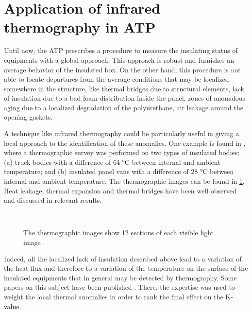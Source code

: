 \section{Application of infrared thermography in ATP}
Until now, the ATP prescribes a procedure to measure the insulating status of equipments with a global approach. This approach is robust and furnishes an average behavior of the insulated box. On the other hand, this procedure is not able to locate departures from the average conditions that may be localized somewhere in the structure, like thermal bridges due to structural elements, lack of insulation due to a bad foam distribution inside the panel, zones of anomalous aging due to a localized degradation of the polyurethane, air leakage around the opening gaskets. 

A technique like infrared thermography could be particularly useful in giving a local approach to the identification of these anomalies. One example is found in \citep{Estrada-Flores1996use}, where a thermographic survey was performed on two types of insulated bodies: (a) truck bodies with a difference of 64 °C between internal and ambient temperature; and (b) insulated panel vans with a difference of 28 °C between internal and ambient temperature. The thermographic images can be found in \ref{Estrada-Flores1996use}. Heat leakage, thermal expansion and thermal bridges have been well observed and discussed in relevant results. 

\begin{figure}[htbp]
	\centering
	\\
	\caption{The thermographic images show 12 sections of each visible light image \citep{Estrada-Flores1996use}.}
	\label{Estrada-Flores1996use}
\end{figure}

Indeed, all the localized lack of insulation described above lead to a variation of the heat flux and therefore to a variation of the temperature on the surface of the insulated equipments that in general may be detected by thermography. Some papers on this subject have been published \citep{grinzatoquality,grinzato1comparison}. There, the expertise was used to weight the local thermal anomalies in order to rank the final effect on the K-value. %

